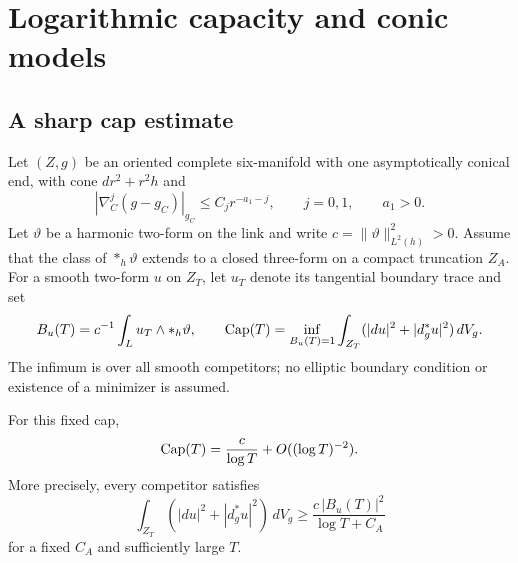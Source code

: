 \section{Logarithmic capacity and conic models}\label{sec:capacity}

\subsection{A sharp cap estimate}
Let $(Z,g)$ be an oriented complete six-manifold with one asymptotically
conical end, with cone $dr^2+r^2h$ and
\[
 |\nabla_C^j(g-g_C)|_{g_C}\le C_jr^{-a_1-j},\qquad j=0,1,
 \qquad a_1>0.
\]
Let $\vartheta$ be a harmonic two-form on the link and write
$c=\|\vartheta\|_{L^2(h)}^2>0$. Assume that the class of
$*_h\vartheta$ extends to a closed three-form on a compact truncation
$Z_A$. For a smooth two-form $u$ on $Z_T$, let $u_T$ denote its
tangential boundary trace and set
\[
 B_u(T)=c^{-1}\int_Lu_T\wedge *_h\vartheta,\qquad
 \operatorname{Cap}(T)=\inf_{B_u(T)=1}\int_{Z_T}(|du|^2+|d_g^*u|^2)\,dV_g.
\]
The infimum is over all smooth competitors; no elliptic boundary
condition or existence of a minimizer is assumed.

\begin{lemma}\label{lem:capacity}
For this fixed cap,
\begin{equation}\label{eq:capacity}
 \operatorname{Cap}(T)=\frac c{\log T}+O((\log T)^{-2}).
\end{equation}
More precisely, every competitor satisfies
\begin{equation}\label{eq:capacity-lower}
 \int_{Z_T}(|du|^2+|d_g^*u|^2)\,dV_g
 \ge \frac{c\,|B_u(T)|^2}{\log T+C_A}
\end{equation}
for a fixed $C_A$ and sufficiently large $T$.
\end{lemma}

